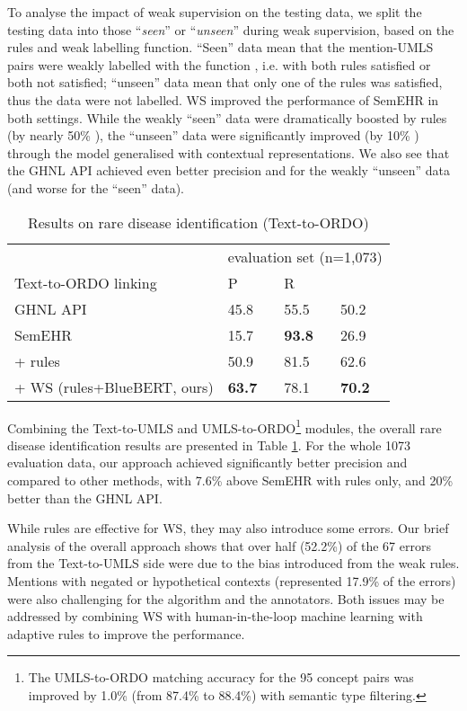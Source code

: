 \documentclass[letterpaper, 10 pt, conference]{ieeeconf}
\begin{document}
To analyse the impact of weak supervision on the testing data, we split the testing data into those ``\emph{seen}'' or ``\emph{unseen}'' during weak supervision, based on the rules and weak labelling function. ``Seen'' data mean that the mention-UMLS pairs were weakly labelled with the function , i.e. with both rules satisfied or both not satisfied; ``unseen'' data mean that only one of the rules was satisfied, thus the data were not labelled. WS improved the performance of SemEHR in both settings. While the weakly ``seen'' data were dramatically boosted by rules (by nearly 50\% ), the ``unseen'' data were significantly improved (by 10\% ) through the model generalised with contextual representations. We also see that the GHNL API achieved even better precision and  for the weakly ``unseen'' data (and worse for the ``seen'' data).

\begin{table}[ht]
\caption{Results on rare disease identification (Text-to-ORDO)}
\center
\label{overall_rd_id_results}
\begin{tabular}{llll}
\cline{1-4}
                 & \multicolumn{3}{l}{evaluation set (n=1,073)} \\
Text-to-ORDO linking               & P           & R           &         \\
\cline{1-4}
GHNL API \cite{Bodnari2020}         & 45.8        & 55.5        & 50.2        \\
\cline{1-4}
SemEHR \cite{Wu2018semehr}           & 15.7        & \textbf{93.8}        & 26.9        \\
+ rules          & 50.9        & 81.5        & 62.6        \\
+ WS (rules+BlueBERT, ours) & \textbf{63.7}        & 78.1        & \textbf{70.2}        \\
\cline{1-4}
\end{tabular}
\end{table}

Combining the Text-to-UMLS and UMLS-to-ORDO\footnote{The UMLS-to-ORDO matching accuracy for the 95 concept pairs was improved by 1.0\% (from 87.4\% to 88.4\%) with semantic type filtering.} modules, the overall rare disease identification results are presented in Table \ref{overall_rd_id_results}. For the whole 1073 evaluation data, our approach achieved significantly better precision and  compared to other methods, with 7.6\%  above SemEHR with rules only, and 20\%  better than the GHNL API.

While rules are effective for WS, they may also introduce some errors. Our brief analysis of the overall approach shows that over half (52.2\%) of the 67 errors from the Text-to-UMLS side were due to the bias introduced from the weak rules. Mentions with negated or hypothetical contexts (represented 17.9\% of the errors) were also challenging for the algorithm and the annotators. Both issues may be addressed by combining WS with human-in-the-loop machine learning \cite{monarch2021} with adaptive rules to improve the performance.
\end{document}

